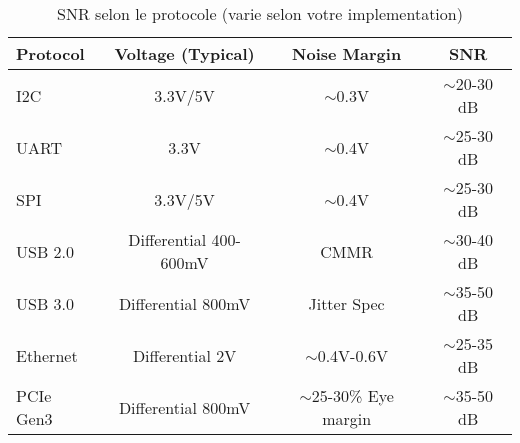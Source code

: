\footnotesize{
\begin{table}
    \caption{SNR selon le protocole (varie selon votre implementation)}
    \begin{tabular}{l|c|c|c}
        \toprule
        Protocol & Voltage (Typical) & Noise Margin & SNR\\
        \midrule
        \hline
        I2C & 3.3V/5V & $\sim$0.3V & $\sim$20-30 dB\\
        UART & 3.3V & $\sim$0.4V & $\sim$25-30 dB\\
        SPI & 3.3V/5V & $\sim$0.4V & $\sim$25-30 dB\\
        USB 2.0 & Differential 400-600mV& CMMR & $\sim$30-40 dB\\
        USB 3.0 & Differential 800mV & Jitter Spec & $\sim$35-50 dB\\
        Ethernet & Differential 2V & $\sim$0.4V-0.6V & $\sim$25-35 dB\\
        PCIe Gen3 & Differential 800mV& $\sim$25-30\% Eye margin & $\sim$35-50 dB\\
        \bottomrule
    \end{tabular}
\end{table}}